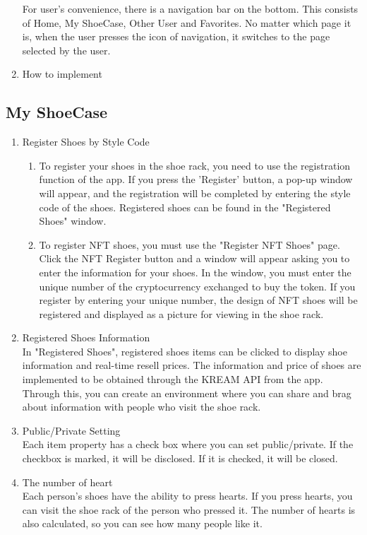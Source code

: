 \documentclass[conference]{IEEEtran}
\begin{document}
\begin{enumerate}
For user’s convenience, there is a navigation bar on the bottom. This consists of Home, My ShoeCase, Other User and Favorites. No matter which page it is, when the user presses the icon of navigation, it switches to the page selected by the user.\\
	\item How to implement\\
\end{enumerate}

\subsection{My ShoeCase}
\begin{enumerate}
	\item Register Shoes by Style Code
	\begin{enumerate}
	\item To register your shoes in the shoe rack, you need to use the registration function of the app. If you press the 'Register' button, a pop-up window will appear, and the registration will be completed by entering the style code of the shoes. Registered shoes can be found in the "Registered Shoes" window.\\
	\item To register NFT shoes, you must use the "Register NFT Shoes" page. Click the NFT Register button and a window will appear asking you to enter the information for your shoes. In the window, you must enter the unique number of the cryptocurrency exchanged to buy the token. If you register by entering your unique number, the design of NFT shoes will be registered and displayed as a picture for viewing in the shoe rack.\\
	\end{enumerate}
	\item Registered Shoes Information\\
In "Registered Shoes", registered shoes items can be clicked to display shoe information and real-time resell prices. 
The information and price of shoes are implemented to be obtained through the KREAM API from the app. 
Through this, you can create an environment where you can share and brag about information with people who visit the shoe rack.\\
	\item Public/Private Setting\\
Each item property has a check box where you can set public/private. 
If the checkbox is marked, it will be disclosed. If it is checked, it will be closed.\\
	\item The number of heart\\
Each person's shoes have the ability to press hearts. 
If you press hearts, you can visit the shoe rack of the person who pressed it. 
The number of hearts is also calculated, so you can see how many people like it.\\
\end{enumerate}
\end{document}
